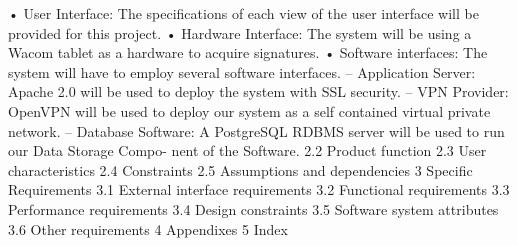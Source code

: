 \documentclass{journal}
\begin{document}
• User Interface: The specifications of each view of the user interface will be provided for this project.
• Hardware Interface: The system will be using a Wacom tablet as a hardware to acquire signatures.
• Software interfaces: The system will have to employ several software interfaces.
– Application Server: Apache 2.0 will be used to deploy the system with SSL security.
– VPN Provider: OpenVPN will be used to deploy our system as a self contained virtual private
network.
– Database Software: A PostgreSQL RDBMS server will be used to run our Data Storage Compo-
nent of the Software.
2.2 Product function
2.3 User characteristics
2.4 Constraints
2.5 Assumptions and dependencies
3
Specific Requirements
3.1 External interface requirements
3.2 Functional requirements
3.3 Performance requirements
3.4 Design constraints
3.5 Software system attributes
3.6 Other requirements
4 Appendixes
5 Index
\end{document}
